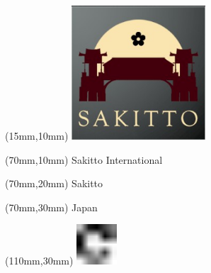 \null\newpage
\begin{textblock*}{50mm}(15mm,10mm)%
\includegraphics[width=50mm]{LG/2015-05-20_00093.png}
\end{textblock*}
\begin{textblock*}{130mm}(70mm,10mm)%
{\fontsize{20}{20}\selectfont Sakitto International}\\
\end{textblock*}
\begin{textblock*}{120mm}(70mm,20mm)%
{\fontsize{16}{16}\selectfont Sakitto}\\
\end{textblock*}
\begin{textblock*}{120mm}(70mm,30mm)%
{\fontsize{12}{12}\selectfont Japan}
\end{textblock*}
\begin{textblock*}{30mm}(110mm,30mm)%
\centering
\includegraphics[height=15mm]{icons/fa-rotate-right.pdf}
\end{textblock*}
